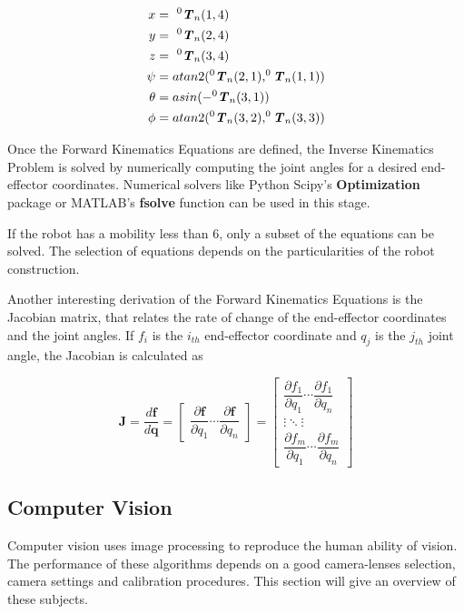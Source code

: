 \documentclass[11pt]{article}
\newcommand{\mbi}[1]{\textbf{\emph{#1}}}
\begin{document}
        \begin{align}
        x & =\ ^0\mbi{T}_n(1,4) \\
        y & =\ ^0\mbi{T}_n(2,4) \\
        z & =\ ^0\mbi{T}_n(3,4) \\
        \psi & = atan2(^0\mbi{T}_n(2,1), ^0\mbi{T}_n(1,1)) \\
        \theta & = asin(-^0\mbi{T}_n(3,1)) \\
        \phi & = atan2(^0\mbi{T}_n(3,2), ^0\mbi{T}_n(3,3))
        \end{align}
        
        Once the Forward Kinematics Equations are defined, the Inverse Kinematics Problem is solved by numerically computing the joint angles for a desired end-effector coordinates. Numerical solvers like Python Scipy's \textbf{Optimization} package or MATLAB's \textbf{fsolve} function can be used in this stage.
        
        If the robot has a mobility less than 6, only a subset of the equations can be solved. The selection of equations depends on the particularities of the robot construction.
        
        Another interesting derivation of the Forward Kinematics Equations is the Jacobian matrix, that relates the rate of change of the end-effector coordinates and the joint angles. If $f_i$ is the $i_{th}$ end-effector coordinate and $q_j$ is the $j_{th}$ joint angle, the Jacobian is calculated as
      
        \begin{equation}
            \mathbf J = \frac{d\mathbf f}{d\mathbf q} =
            \begin{bmatrix}
            \dfrac{\partial \mathbf{f}}{\partial q_1} \cdots \dfrac{\partial \mathbf{f}}{\partial q_n} \end{bmatrix}
            = \begin{bmatrix}
            \dfrac{\partial f_1}{\partial q_1} \cdots \dfrac{\partial f_1}{\partial q_n}\\
            \vdots \ddots \vdots\\
            \dfrac{\partial f_m}{\partial q_1} \cdots \dfrac{\partial f_m}{\partial q_n} \end{bmatrix}
        \end{equation}
        
    \subsection{Computer Vision}
        Computer vision uses image processing to reproduce the human ability of vision. The performance of these algorithms depends on a good camera-lenses selection, camera settings and calibration procedures. This section will give an overview of these subjects.
        
\end{document}
